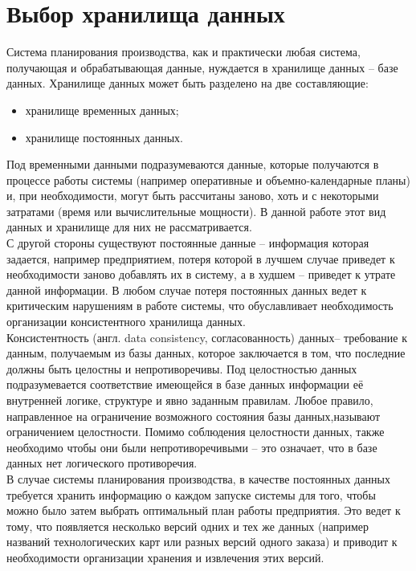
\section{Выбор хранилища данных}\label{sec:choose}
\indent Система планирования производства, как и практически любая система, получающая и обрабатывающая данные, нуждается в хранилище данных -- базе данных.
Хранилище данных может быть разделено на две составляющие:
\begin{itemize}
	\item хранилище временных данных;
	\item хранилище постоянных данных.
\end{itemize}

\indent Под временными данными подразумеваются данные, которые получаются в процессе работы системы (например оперативные и объемно-календарные планы) и, при необходимости, могут быть рассчитаны заново, хоть и с некоторыми затратами (время или вычислительные мощности).
В данной работе этот вид данных и хранилище для них не рассматривается.\\
\indent С другой стороны существуют постоянные данные -- информация которая задается, например предприятием, потеря которой в лучшем случае приведет к необходимости заново добавлять их в систему, а в худшем -- приведет к утрате данной информации.
В любом случае потеря постоянных данных ведет к критическим нарушениям в работе системы, что обуславливает необходимость организации консистентного хранилища данных.\\
\indent Консистентность (англ. data consistency, согласованность) данных-- требование к данным, получаемым из базы данных, которое заключается в том, что последние должны быть целостны и непротиворечивы.
Под целостностью данных подразумевается соответствие имеющейся в базе данных информации её внутренней логике, структуре и явно заданным правилам.
Любое правило, направленное на ограничение возможного состояния базы данных,называют ограничением целостности.
Помимо соблюдения целостности данных, также необходимо чтобы они были непротиворечивыми -- это означает, что в базе данных нет логического противоречия.\\
\indent В случае системы планирования производства, в качестве постоянных данных требуется хранить информацию о каждом запуске системы для того, чтобы можно было затем выбрать оптимальный план работы предприятия.
Это ведет к тому, что появляется несколько версий одних и тех же данных (например названий технологических карт или разных версий одного заказа) и приводит к необходимости организации хранения и извлечения этих версий.
